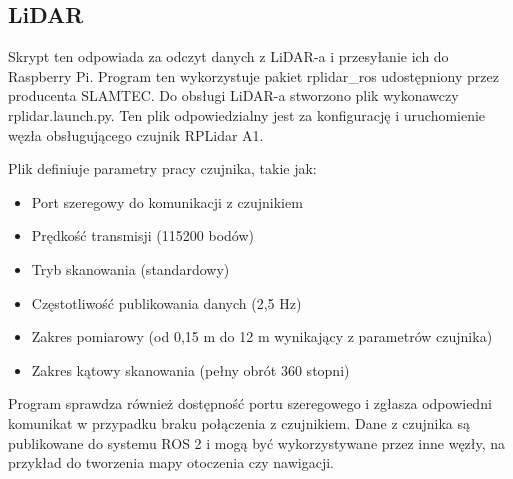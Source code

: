 \documentclass[a4paper,twoside,12pt]{book}
\begin{document}
\newpage
\subsection{LiDAR}
Skrypt ten odpowiada za odczyt danych z LiDAR-a i przesyłanie ich do Raspberry Pi. Program ten wykorzystuje pakiet rplidar\_ros udostępniony przez producenta SLAMTEC. 
Do obsługi LiDAR-a stworzono plik wykonawczy rplidar.launch.py. Ten plik odpowiedzialny jest za konfigurację i uruchomienie węzła obsługującego czujnik RPLidar A1. 


Plik definiuje parametry pracy czujnika, takie jak:
\begin{itemize}
\item Port szeregowy do komunikacji z czujnikiem
\item Prędkość transmisji (115200 bodów)
\item Tryb skanowania (standardowy)
\item Częstotliwość publikowania danych (2,5 Hz)
\item Zakres pomiarowy (od 0,15 m do 12 m wynikający z parametrów czujnika)
\item Zakres kątowy skanowania (pełny obrót 360 stopni)
\end{itemize}

Program sprawdza również dostępność portu szeregowego i zgłasza odpowiedni komunikat w przypadku braku połączenia z czujnikiem. Dane z czujnika są publikowane do systemu ROS 2 i mogą być wykorzystywane przez inne węzły, na przykład do tworzenia mapy otoczenia czy nawigacji.
\end{document}
